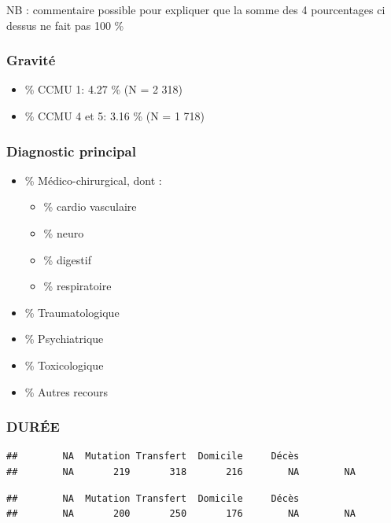 \documentclass[]{article}
\begin{document}
NB : commentaire possible pour expliquer que la somme des 4 pourcentages
ci dessus ne fait pas 100 \%

\subsubsection{Gravité}\label{gravite}

\begin{itemize}
\itemsep1pt\parskip0pt
\item
  \% CCMU 1: 4.27 \% (N = 2 318)
\item
  \% CCMU 4 et 5: 3.16 \% (N = 1 718)
\end{itemize}

\subsubsection{Diagnostic principal}\label{diagnostic-principal}

\begin{itemize}
\itemsep1pt\parskip0pt
\item
  \% Médico-chirurgical, dont :

  \begin{itemize}
  \itemsep1pt\parskip0pt
  \item
    \% cardio vasculaire
  \item
    \% neuro
  \item
    \% digestif
  \item
    \% respiratoire
  \end{itemize}
\item
  \% Traumatologique
\item
  \% Psychiatrique
\item
  \% Toxicologique
\item
  \% Autres recours
\end{itemize}

\subsubsection{DURÉE}\label{duree}

\begin{verbatim}
##        NA  Mutation Transfert  Domicile     Décès           
##        NA       219       318       216        NA        NA
\end{verbatim}

\begin{verbatim}
##        NA  Mutation Transfert  Domicile     Décès           
##        NA       200       250       176        NA        NA
\end{verbatim}
\end{document}
